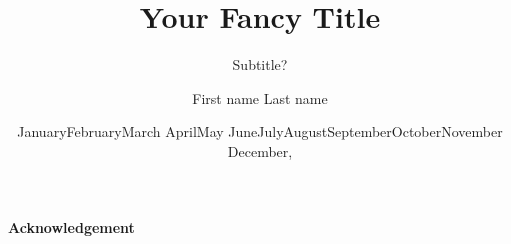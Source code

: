 \documentclass[a4paper,12pt]{article}
\begin{document}

\renewcommand{\today}{\ifcase \month \or January\or February\or March\or %
April\or May \or June\or July\or August\or September\or October\or November\or %
December\fi, \number \year} 

\date{\today}


\title{Your Fancy Title}

\subtitle{Subtitle?}




\author{First name Last name}




\secrecy{}

\maketitle

\frontmatter

\blankpage
\begin{abstract}

\end{abstract}
\blankpage

\begin{sammanfattning}

\end{sammanfattning}

\paragraph{Acknowledgement}

\newpage
\end{document}
